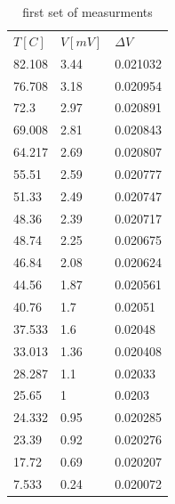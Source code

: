 \documentclass[12pt,a4paper]{report}
\begin{document}
\begin{table}[H]
\centering
\begin{tabular}{|l|l|l|}
\hline
$T[C]$ & $V[mV]$  & $\Delta V$     \\
82.108   & 3.44       & 0.021032 \\ \hline
76.708   & 3.18       & 0.020954 \\ \hline
72.3     & 2.97       & 0.020891 \\ \hline
69.008   & 2.81       & 0.020843 \\ \hline
64.217   & 2.69       & 0.020807 \\ \hline
55.51    & 2.59       & 0.020777 \\ \hline
51.33    & 2.49       & 0.020747 \\ \hline
48.36    & 2.39       & 0.020717 \\ \hline
48.74    & 2.25       & 0.020675 \\ \hline
46.84    & 2.08       & 0.020624 \\ \hline
44.56    & 1.87       & 0.020561 \\ \hline
40.76    & 1.7        & 0.02051  \\ \hline
37.533   & 1.6        & 0.02048  \\ \hline
33.013   & 1.36       & 0.020408 \\ \hline
28.287   & 1.1        & 0.02033  \\ \hline
25.65    & 1          & 0.0203   \\ \hline
24.332   & 0.95       & 0.020285 \\ \hline
23.39    & 0.92       & 0.020276 \\ \hline
17.72    & 0.69       & 0.020207 \\ \hline
7.533    & 0.24       & 0.020072 \\ \hline

\end{tabular}
\caption{first set of measurments}
\end{table}
\end{document}
